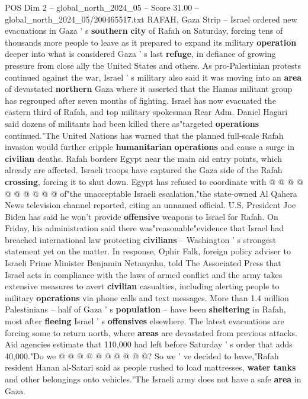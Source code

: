 \begin{textsample}{POS Dim 2 – global\_north\_2024\_05 – Score 31.00 – global\_north\_2024\_05/200465517.txt}  \label{ex:f2_pos_294}
RAFAH, Gaza Strip -- Israel ordered new evacuations in Gaza ' s \textbf{southern} \textbf{city} of Rafah on Saturday, forcing tens of thousands more people to leave as it prepared to expand its military \textbf{operation} deeper into what is considered Gaza ' s last \textbf{refuge}, in defiance of growing pressure from close ally the United States and others.
As pro-Palestinian protests continued against the war, Israel ' s military also said it was moving into an \textbf{area} of devastated \textbf{northern} Gaza where it asserted that the Hamas militant group has regrouped after seven months of fighting.
Israel has now evacuated the eastern third of Rafah, and top military spokesman Rear Adm.
Daniel Hagari said dozens of militants had been killed there as"targeted \textbf{operations} continued."The United Nations has warned that the planned full-scale Rafah invasion would further cripple \textbf{humanitarian} \textbf{operations} and cause a surge in \textbf{civilian} deaths.
Rafah borders Egypt near the main aid entry points, which already are affected.
Israeli troops have captured the Gaza side of the Rafah \textbf{crossing}, forcing it to shut down.
Egypt has refused to coordinate with @ @ @ @ @ @ @ @ @ @ of"the unacceptable Israeli escalation,"the state-owned Al Qahera News television channel reported, citing an unnamed official.
U.S.
President Joe Biden has said he won't provide \textbf{offensive} weapons to Israel for Rafah.
On Friday, his administration said there was"reasonable"evidence that Israel had breached international law protecting \textbf{civilians} -- Washington ' s strongest statement yet on the matter.
In response, Ophir Falk, foreign policy adviser to Israeli Prime Minister Benjamin Netanyahu, told The Associated Press that Israel acts in compliance with the laws of armed conflict and the army takes extensive measures to avert \textbf{civilian} casualties, including alerting people to military \textbf{operations} via phone calls and text messages.
More than 1.4 million Palestinians -- half of Gaza ' s \textbf{population} -- have been \textbf{sheltering} in Rafah, most after \textbf{fleeing} Israel ' s \textbf{offensives} elsewhere.
The latest evacuations are forcing some to return north, where \textbf{areas} are devastated from previous attacks.
Aid agencies estimate that 110,000 had left before Saturday ' s order that adds 40,000."Do we @ @ @ @ @ @ @ @ @ @?
So we ' ve decided to leave,"Rafah resident Hanan al-Satari said as people rushed to load mattresses, \textbf{water} \textbf{tanks} and other belongings onto vehicles."The Israeli army does not have a safe \textbf{area} in Gaza.

\end{textsample}
